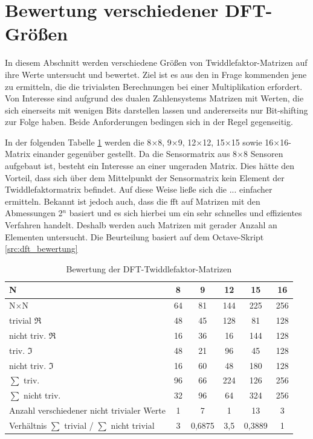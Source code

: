 \section{Bewertung verschiedener DFT-Größen}\label{sec:AnalyseBewertungTwiddlefaktornMatrizen}

In diesem Abschnitt werden verschiedene Größen von Twiddlefaktor-Matrizen auf ihre Werte untersucht und bewertet.
Ziel ist es aus den in Frage kommenden jene zu ermitteln, die die trivialsten Berechnungen bei einer 
Multiplikation erfordert. Von Interesse sind aufgrund des dualen Zahlensystems Matrizen mit Werten, die sich einerseits 
mit wenigen Bits darstellen lassen und andererseits nur Bit-shifting zur Folge haben. Beide Anforderungen bedingen 
sich in der Regel gegenseitig.

In der folgenden Tabelle \ref{tab:DFT-TwiddlefaktorMatrizenBewertung} werden die 8$\times$8, 9$\times$9, 12$\times$12, 15$\times$15 sowie 16$\times$16-Matrix einander gegenüber gestellt.
Da die Sensormatrix aus 8$\times$8 Sensoren aufgebaut ist, besteht ein Interesse an einer ungeraden Matrix. Dies hätte den Vorteil, dass
sich über dem Mittelpunkt der Sensormatrix kein Element der Twiddlefaktormatrix befindet. Auf diese Weise ließe sich die ... einfacher ermitteln.
Bekannt ist jedoch auch,
dass die \gls{fft} auf Matrizen mit den Abmessungen 2$^n$ basiert und es sich hierbei um ein sehr schnelles und effizientes Verfahren handelt. 
Deshalb werden auch Matrizen mit gerader Anzahl an Elementen untersucht.
Die Beurteilung basiert auf dem Octave-Skript \ref{src:dft_bewertung}


 \vspace{1cm}
 \begingroup
  \renewcommand*{\arraystretch}{1.2} %
  \begin{table}[!ht]
  \centering
  \caption{Bewertung der DFT-Twiddlefaktor-Matrizen}
   \begin{tabular}{lccccc}
   \hline
    N							& 8	& 9	& 12	& 15		& 16 \\
    \hline
    N$\times$N						& 64	& 81	& 144	& 225		& 256 \\
    \rowcolor{lightgray}
    trivial $\Re$ 					& 48	& 45	& 128	& 81		& 128 \\
    \rowcolor{lightgray}
    nicht triv. $\Re$					& 16	& 36	& 16	& 144		& 128 \\
    triv. $\Im$ 					& 48	& 21	& 96	& 45		& 128 \\
    nicht triv. $\Im$ 					& 16	& 60	& 48	& 180		& 128 \\
    \rowcolor{lightgray}
    $\sum$ triv. 					& 96	& 66	& 224	& 126		& 256 \\
    \rowcolor{lightgray}
    $\sum$ nicht triv. 					& 32	& 96	& 64	& 324		& 256 \\
    Anzahl verschiedener nicht trivialer Werte          & 1     & 7     & 1     & 13            & 3 \\
    Verhältnis  $\sum$ trivial / $\sum$ nicht trivial	& 3	& 0,6875& 3,5	& 0,3889	& 1\\
    \hline
   \end{tabular}
   \label{tab:DFT-TwiddlefaktorMatrizenBewertung}
  \end{table}
 \endgroup
 \vspace{1cm}
 
